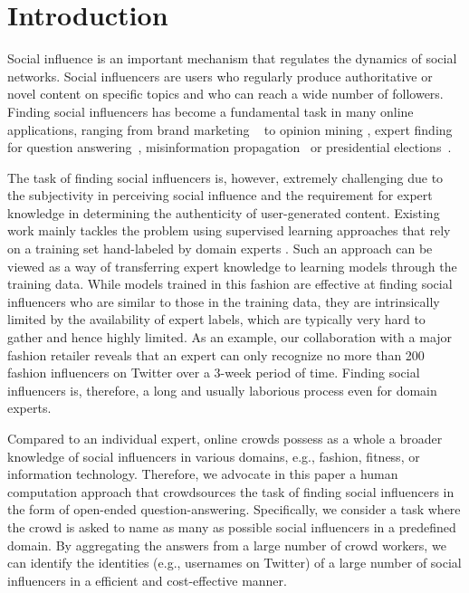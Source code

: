 \section{Introduction}

Social influence is an important mechanism that regulates the dynamics of social networks. Social influencers are users who regularly produce authoritative or novel content on specific topics and who can reach a wide number of followers. Finding social influencers has become a fundamental task in many online applications, ranging from brand marketing
~\cite{bond201261,richardson2002mining,van2007new} to opinion mining \cite{pang2008opinion,li2012mining}, expert finding for question 
answering~\cite{riahi2012finding}, misinformation propagation~\cite{DBLP:conf/icde/SongHL17} or presidential elections~\cite{DBLP:journals/nature/BondFJKMSF12}.

The task of finding social influencers is, however, extremely challenging due to the subjectivity in perceiving social influence and the requirement for expert knowledge in determining the authenticity of user-generated content. Existing work mainly tackles the problem using supervised learning approaches that rely on a training set hand-labeled by domain experts \cite{Cheng2014,Lehmann2013,wei2016learning}. Such an approach can be viewed as a way of transferring expert knowledge to learning models through the training data. While models trained in this fashion are effective at finding social influencers who are similar to those in the training data, they are intrinsically limited by the availability of expert labels, which are typically very hard to gather and hence highly limited. As an example, our collaboration with a major fashion retailer reveals that an expert can only recognize no more than 200 fashion influencers on Twitter over a 3-week period of time. Finding social influencers is, therefore, a long and usually laborious process even for domain experts.

Compared to an individual expert, online crowds 
possess as a whole a broader knowledge of social influencers in various domains, e.g., fashion, fitness, or information technology. Therefore, we advocate in this paper a human computation approach that crowdsources the task of finding social influencers in the form of open-ended question-answering. Specifically, we consider a task where the crowd is asked to name as many as possible social influencers in a predefined domain. By aggregating the answers from a large number of crowd workers, we can identify the identities (e.g., usernames on Twitter) of a large number of social influencers in a efficient and cost-effective manner. 

